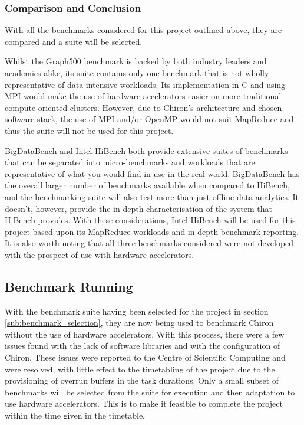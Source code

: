 \documentclass[12pt,a4paper]{article}
\begin{document}
            \subsubsection{Comparison and Conclusion}
            \label{ssub:comparison_and_conclusion}

                With all the benchmarks considered for this project outlined above, they are compared and a suite will be selected.

                Whilst the Graph500 benchmark is backed by both industry leaders and academics alike, its suite contains only one benchmark that is not wholly representative of data intensive workloads. Its implementation in C and using MPI would make the use of hardware accelerators easier on more traditional compute oriented clusters. However, due to Chiron's architecture and chosen software stack, the use of MPI and/or OpenMP would not suit MapReduce and thus the suite will not be used for this project.

                BigDataBench and Intel HiBench both provide extensive suites of benchmarks that can be separated into micro-benchmarks and workloads that are representative of what you would find in use in the real world. BigDataBench has the overall larger number of benchmarks available when compared to HiBench, and the benchmarking suite will also test more than just offline data analytics. It doesn't, however, provide the in-depth characterisation of the system that HiBench provides. With these considerations, Intel HiBench will be used for this project based upon its MapReduce workloads and in-depth benchmark reporting. It is also worth noting that all three benchmarks considered were not developed with the prospect of use with hardware accelerators.
            
        \subsection{Benchmark Running}
        \label{sub:benchmark_running}

            With the benchmark suite having been selected for the project in section \ref{sub:benchmark_selection}, they are now being used to benchmark Chiron without the use of hardware accelerators. With this process, there were a few issues found with the lack of software libraries and with the configuration of Chiron. These issues were reported to the Centre of Scientific Computing and were resolved, with little effect to the timetabling of the project due to the provisioning of overrun buffers in the task durations. Only a small subset of benchmarks will be selected from the suite for execution and then adaptation to use hardware accelerators. This is to make it feasible to complete the project within the time given in the timetable.
\end{document}
